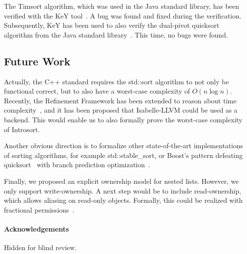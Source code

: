 \documentclass[sigplan,10pt,anonymous,review]{acmart}\settopmatter{printfolios=true,printccs=false,printacmref=false}
\theoremstyle{definition}
\begin{document}
The Timsort algorithm, which was used in the Java standard library, has been verified
with the KeY tool~\cite{GRBBH15}. A bug was found and fixed during the verification.
Subsequently, KeY has been used to also verify the dual-pivot quicksort algorithm from the
Java standard library~\cite{BSSU17}. This time, no bugs were found.

\subsection{Future Work}
Actually, the C++ standard requires the std::sort algorithm to not only be functional correct,
but to also have a worst-case complexity of $O(n\log n)$. Recently, the Refinement Framework has been extended to reason
about time complexity~\cite{HaLa19}, and it has been proposed that Isabelle-LLVM could be used as a backend.
This would enable us to also formally prove the worst-case complexity of Introsort.

Another obvious direction is to formalize other state-of-the-art implementations of sorting algorithms,
for example std::stable\_sort, or Boost's pattern defeating quicksort~\cite{boost} with branch prediction optimization~\cite{EdWe16}.

Finally, we proposed an explicit ownership model for nested lists.
However, we only support write-ownership. A next step would be to include read-ownership, which allows aliasing on read-only objects.
Formally, this could be realized with fractional permissions~\cite{BCOP05}.


%


\paragraph{Acknowledgements}Hidden for blind review.
%
\end{document}
